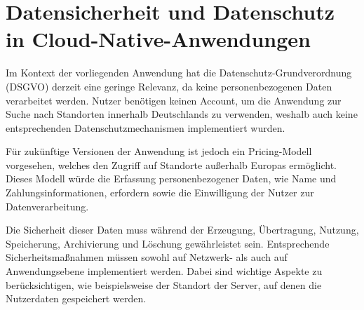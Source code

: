 \chapter{Datensicherheit und Datenschutz in Cloud-Native-Anwendungen}
Im Kontext der vorliegenden Anwendung hat die Datenschutz-Grundverordnung (DSGVO) derzeit eine geringe Relevanz, da keine personenbezogenen Daten verarbeitet werden. Nutzer benötigen keinen Account, um die Anwendung zur Suche nach Standorten innerhalb Deutschlands zu verwenden, weshalb auch keine entsprechenden Datenschutzmechanismen implementiert wurden.

Für zukünftige Versionen der Anwendung ist jedoch ein Pricing-Modell vorgesehen, welches den Zugriff auf Standorte außerhalb Europas ermöglicht. Dieses Modell würde die Erfassung personenbezogener Daten, wie Name und Zahlungsinformationen, erfordern sowie die Einwilligung der Nutzer zur Datenverarbeitung.

Die Sicherheit dieser Daten muss während der Erzeugung, Übertragung, Nutzung, Speicherung, Archivierung und Löschung gewährleistet sein. Entsprechende Sicherheitsmaßnahmen müssen sowohl auf Netzwerk- als auch auf Anwendungsebene implementiert werden. Dabei sind wichtige Aspekte zu berücksichtigen, wie beispielsweise der Standort der Server, auf denen die Nutzerdaten gespeichert werden.